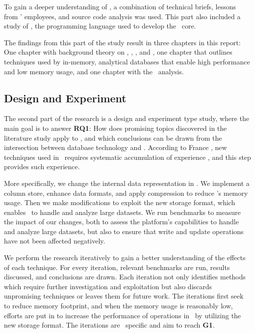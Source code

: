 
To gain a deeper understanding of \gap, a combination of technical briefs, lessons from \genus' employees, and source code analysis was used.  This part also included a study of \delphi, the programming language used to develop the \gap~core.

The findings from this part of the study result in three chapters in this report: One chapter with background theory on \mde, \bi, \bd, and \delphi, one chapter that outlines techniques used by in-memory, analytical databases that enable high performance and low memory usage, and one chapter with the \gap~analysis.

\subsection{Design and Experiment}
\label{sub:Design and Experiment}
The second part of the research is a design and experiment type study, where the main goal is to answer \textbf{RQ1}: How does promising topics discovered in the literature study apply to \gap, and which conclusions can be drawn from the intersection between database technology and \mde. According to France \ea, new techniques used in \mde~requires systematic accumulation of experience \cite{France2007-ae}, and this step provides such experience.

More specifically, we change the internal data representation in \gap. We implement a column store, enhance data formats, and apply compression to reduce \gap's memory usage. Then we make modifications to exploit the new storage format, which enables \gap~to handle and analyze large datasets. We run benchmarks to measure the impact of our changes, both to assess the platform's capabilities to handle and analyze large datasets, but also to ensure that write and update operations have not been affected negatively. 

We perform the research iteratively to gain a better understanding of the effects of each technique. For every iteration, relevant benchmarks are run, results discussed, and conclusions are drawn. Each iteration not only identifies methods which require further investigation and exploitation but also discards unpromising techniques or leaves them for future work. The iterations first seek to reduce memory footprint, and when the memory usage is reasonably low, efforts are put in to increase the performance of operations in \gap~by utilizing the new storage format. The iterations are \gap~specific and aim to reach \textbf{G1}. 

